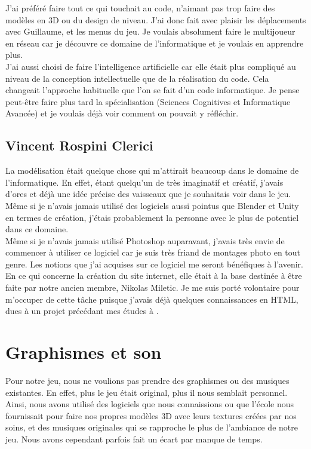 \documentclass[12pt, titlepage]{article}
\begin{document}
\begin{spacing}{1.5}
J'ai préféré faire tout ce qui touchait au code, n'aimant pas trop faire des modèles en 3D ou du design de niveau. J'ai donc fait avec plaisir les déplacements avec Guillaume, et les menus du jeu. Je voulais absolument faire le multijoueur en réseau car je découvre ce domaine de l'informatique et je voulais en apprendre plus.\\

J'ai aussi choisi de faire l'intelligence artificielle car elle était plus compliqué au niveau de la conception intellectuelle que de la réalisation du code. Cela changeait l'approche habituelle que l'on se fait d'un code informatique. Je pense peut-être faire plus tard la spécialisation  (Sciences Cognitives et Informatique Avancée) et je voulais déjà voir comment on pouvait y réfléchir.\\

\subsection{Vincent Rospini Clerici}

La modélisation était quelque chose qui m’attirait beaucoup dans le domaine de l’informatique. En effet, étant quelqu’un de très imaginatif et créatif, j’avais d’ores et déjà une idée précise des vaisseaux que je souhaitais voir dans le jeu. Même si je n’avais jamais utilisé des logiciels aussi pointus que Blender et Unity en termes de création, j’étais probablement la personne avec le plus de potentiel dans ce domaine.\\

Même si je n’avais jamais utilisé Photoshop auparavant, j’avais très envie de commencer à utiliser ce logiciel car je suis très friand de montages photo en tout genre. Les notions que j’ai acquises sur ce logiciel me seront bénéfiques à l’avenir.\\

En ce qui concerne la création du site internet, elle était à la base destinée à être faite par notre ancien membre, Nikolas Miletic. Je me suis porté volontaire pour m’occuper de cette tâche puisque j’avais déjà quelques connaissances en HTML, dues à un projet précédant mes études à .\\


\newpage
\section{Graphismes et son}

Pour notre jeu, nous ne voulions pas prendre des graphismes ou des musiques existantes. En effet, plus le jeu était original, plus il nous semblait personnel. Ainsi, nous avons utilisé des logiciels que nous connaissions ou que l'école nous fournissait pour faire nos propres modèles 3D avec leurs textures créées par nos soins, et des musiques originales qui se rapproche le plus de l'ambiance de notre jeu. Nous avons cependant parfois fait un écart par manque de temps.\\


\end{spacing}
\end{document}
